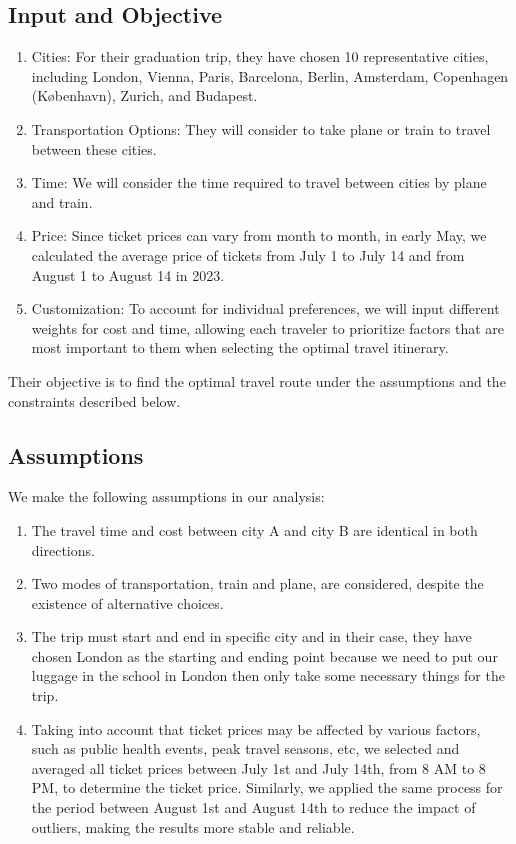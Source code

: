 \documentclass{extarticle}
\begin{document}
\subsection{Input and Objective}

\begin{enumerate}
  \item Cities: For their graduation trip, they have chosen 10 representative cities,
        including London, Vienna, Paris, Barcelona, Berlin, Amsterdam, Copenhagen
        (København), Zurich, and Budapest.
  \item Transportation Options: They will consider to take plane or train to travel
        between these cities.
  \item Time: We will consider the time required to travel between cities by plane and
        train.
  \item Price: Since ticket prices can vary from month to month, in early May, we
        calculated the average price of tickets from July 1 to July 14 and from August
        1 to August 14 in 2023.
  \item Customization: To account for individual preferences, we will input different
        weights for cost and time, allowing each traveler to prioritize factors that
        are most important to them when selecting the optimal travel itinerary.
\end{enumerate}

Their objective is to find the optimal travel route under the assumptions and
the constraints described below.

\subsection{Assumptions}

We make the following assumptions in our analysis:

\begin{enumerate}
  \item The travel time and cost between city A and city B are identical in both directions.
  \item Two modes of transportation, train and plane, are considered, despite the
        existence of alternative choices.
  \item The trip must start and end in specific city and in their case, they have chosen London
        as the starting and ending point because we need to put our luggage in the
        school in London then only take some necessary things for the trip.
  \item Taking into account that ticket prices may be affected by various factors, such as public health events, peak travel seasons, etc, we selected and averaged
        all ticket prices between July 1st and July 14th, from 8 AM to 8 PM, to
        determine the ticket price. Similarly, we applied the same process for the
        period between August 1st and August 14th to reduce the impact of outliers, making the results more stable and reliable.\
\end{enumerate}
\end{document}
